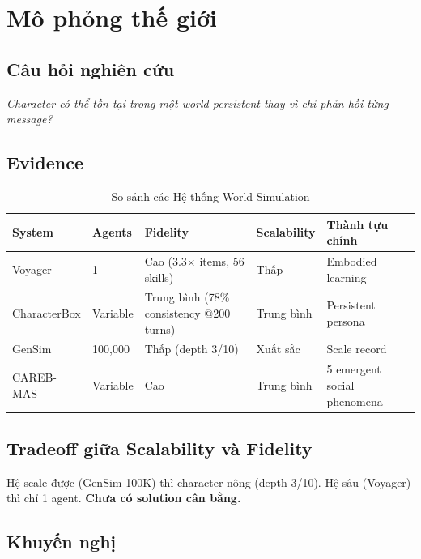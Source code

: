 \documentclass[10pt,leqno]{amsart}
\begin{document}

\section{Mô phỏng thế giới}

\subsection{Câu hỏi nghiên cứu}

\textit{Character có thể tồn tại trong một world persistent thay vì chỉ phản hồi từng message?}

\subsection{Evidence}

\begin{table}[H]
\centering
\caption{So sánh các Hệ thống World Simulation}
\label{tab:world-sim}
\begin{tabular}{lllll}
\toprule
\textbf{System} & \textbf{Agents} & \textbf{Fidelity} & \textbf{Scalability} & \textbf{Thành tựu chính} \\
\midrule
Voyager & 1 & Cao (3.3$\times$ items, 56 skills) & Thấp & Embodied learning \\
CharacterBox & Variable & Trung bình (78\% consistency @200 turns) & Trung bình & Persistent persona \\
GenSim & 100,000 & Thấp (depth 3/10) & Xuất sắc & Scale record \\
CAREB-MAS & Variable & Cao & Trung bình & 5 emergent social phenomena \\
\bottomrule
\end{tabular}
\end{table}

\subsection{Tradeoff giữa Scalability và Fidelity}

Hệ scale được (GenSim 100K) thì character nông (depth 3/10). Hệ sâu (Voyager) thì chỉ 1 agent. \textbf{Chưa có solution cân bằng.}

\subsection{Khuyến nghị}
\end{document}
